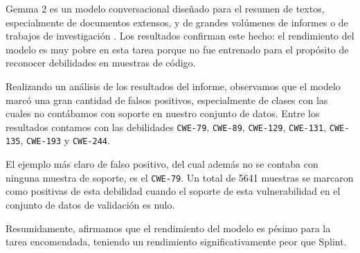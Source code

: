\documentclass[12pt, a4paper, twoside]{article}
\begin{document}
Gemma 2 es un modelo conversacional diseñado para el resumen de textos, especialmente de documentos extensos, y de grandes volúmenes de informes o de trabajos de investigación \cite{caballar-2025}. Los resultados confirman este hecho: el rendimiento del modelo es muy pobre en esta tarea porque no fue entrenado para el propósito de reconocer debilidades en muestras de código.

Realizando un análisis de los resultados del informe, observamos que el modelo marcó una gran cantidad de falsos positivos, especialmente de clases con las cuales no contábamos con soporte en nuestro conjunto de datos. Entre los resultados contamos con las debilidades \texttt{CWE-79}, \texttt{CWE-89}, \texttt{CWE-129}, \texttt{CWE-131}, \texttt{CWE-135}, \texttt{CWE-193} y \texttt{CWE-244}.

El ejemplo más claro de falso positivo, del cual además no se contaba con ninguna muestra de soporte, es el \texttt{CWE-79}. Un total de 5641 muestras se marcaron como positivas de esta debilidad cuando el soporte de esta vulnerabilidad en el conjunto de datos de validación es nulo.

Resumidamente, afirmamos que el rendimiento del modelo es pésimo para la tarea encomendada, teniendo un rendimiento significativamente peor que Splint.
\end{document}
